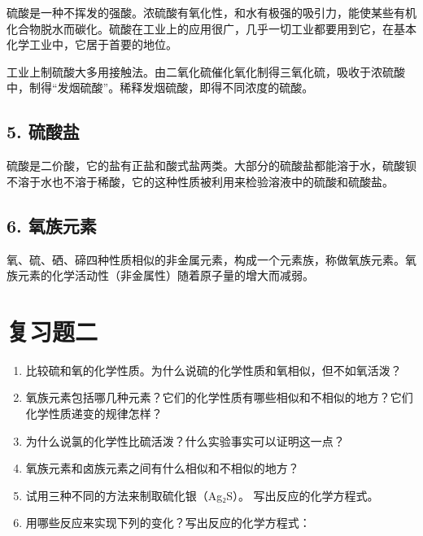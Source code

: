 硫酸是一种不挥发的强酸。浓硫酸有氧化性，和水有极强的吸引力，能使某些有机化合物脱水而碳化。硫酸在工业上的应用很广，几乎一切工业都要用到它，在基本化学工业中，它居于首要的地位。

工业上制硫酸大多用接触法。由二氧化硫催化氧化制得三氧化硫，吸收于浓硫酸中，制得``发烟硫酸''。稀释发烟硫酸，即得不同浓度的硫酸。

\subsection{5. 硫酸盐}

硫酸是二价酸，它的盐有正盐和酸式盐两类。大部分的硫酸盐都能溶于水，硫酸钡不溶于水也不溶于稀酸，它的这种性质被利用来检验溶液中的硫酸和硫酸盐。

\subsection{6. 氧族元素}

氧、硫、硒、碲四种性质相似的非金属元素，构成一个元素族，称做氧族元素。氧族元素的化学活动性（非金属性）随着原子量的增大而减弱。

\section{复习题二}

\begin{enumerate}
\item
  比较硫和氧的化学性质。为什么说硫的化学性质和氧相似，但不如氧活泼？
\item
  氧族元素包括哪几种元素？它们的化学性质有哪些相似和不相似的地方？它们化学性质递变的规律怎样？
\item
  为什么说氯的化学性比硫活泼？什么实验事实可以证明这一点？
\item
  氧族元素和卤族元素之间有什么相似和不相似的地方？
\item
  试用三种不同的方法来制取硫化银（Ag₂S）。 写出反应的化学方程式。
\item
  用哪些反应来实现下列的变化？写出反应的化学方程式：
\end{enumerate}

